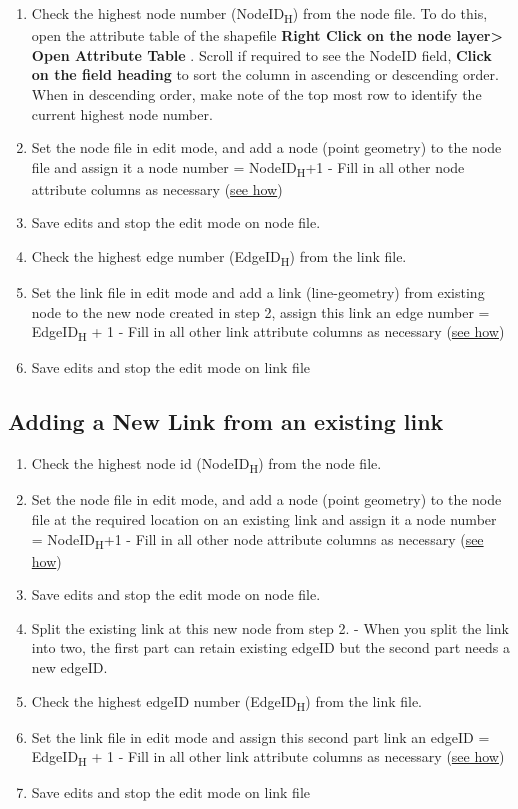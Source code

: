 \documentclass[
]{book}
\providecommand{\tightlist}{%
  \setlength{\itemsep}{0pt}\setlength{\parskip}{0pt}}
\begin{document}
\begin{enumerate}
\def\labelenumi{\arabic{enumi}.}
\tightlist
\item
  Check the highest node number (NodeID\textsubscript{H}) from the node file. To do this, open the attribute table of the shapefile \textbf{Right Click on the node layer\textgreater{} Open Attribute Table} . Scroll if required to see the NodeID field, \textbf{Click on the field heading} to sort the column in ascending or descending order. When in descending order, make note of the top most row to identify the current highest node number.
\item
  Set the node file in edit mode, and add a node (point geometry) to the node file and assign it a node number = NodeID\textsubscript{H}+1
  - Fill in all other node attribute columns as necessary (\hyperref[modifying-node-attributes]{see how})
\item
  Save edits and stop the edit mode on node file.
\item
  Check the highest edge number (EdgeID\textsubscript{H}) from the link file.
\item
  Set the link file in edit mode and add a link (line-geometry) from existing node to the new node created in step 2, assign this link an edge number = EdgeID\textsubscript{H} + 1
  - Fill in all other link attribute columns as necessary (\hyperref[modifying-edge-attributes]{see how})
\item
  Save edits and stop the edit mode on link file
\end{enumerate}

\subsection{Adding a New Link from an existing link}\label{adding-a-new-link-from-an-existing-link}

\begin{enumerate}
\def\labelenumi{\arabic{enumi}.}
\tightlist
\item
  Check the highest node id (NodeID\textsubscript{H}) from the node file.
\item
  Set the node file in edit mode, and add a node (point geometry) to the node file at the required location on an existing link and assign it a node number = NodeID\textsubscript{H}+1
  - Fill in all other node attribute columns as necessary (\hyperref[modifying-node-attributes]{see how})
\item
  Save edits and stop the edit mode on node file.
\item
  Split the existing link at this new node from step 2.
  - When you split the link into two, the first part can retain existing edgeID but the second part needs a new edgeID.
\item
  Check the highest edgeID number (EdgeID\textsubscript{H}) from the link file.
\item
  Set the link file in edit mode and assign this second part link an edgeID = EdgeID\textsubscript{H} + 1
  - Fill in all other link attribute columns as necessary (\hyperref[modifying-edge-attributes]{see how})
\item
  Save edits and stop the edit mode on link file
\end{enumerate}
\end{document}
